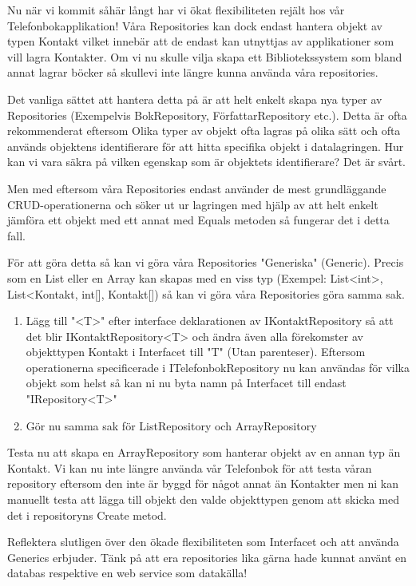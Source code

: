 \documentclass{article}
\begin{document}
     Nu när vi kommit såhär långt har vi ökat flexibiliteten rejält hos vår Telefonbokapplikation! Våra Repositories kan dock endast hantera objekt av typen Kontakt vilket innebär att de endast kan utnyttjas av applikationer som vill lagra Kontakter. Om vi nu skulle vilja skapa ett Bibliotekssystem som bland annat lagrar böcker så skullevi inte längre kunna använda våra repositories.
     
Det vanliga sättet att hantera detta på är att helt enkelt skapa nya typer av Repositories (Exempelvis BokRepository, FörfattarRepository etc.).
Detta är ofta rekommenderat eftersom Olika typer av objekt ofta lagras på olika sätt och ofta används objektens identifierare för att hitta specifika objekt i datalagringen. Hur kan vi vara säkra på vilken egenskap som är objektets identifierare? Det är svårt.

Men med eftersom våra Repositories endast använder de mest grundläggande CRUD-operationerna och söker ut ur lagringen med hjälp av att helt enkelt jämföra ett objekt med ett annat med Equals metoden så fungerar det i detta fall.

För att göra detta så kan vi göra våra Repositories "Generiska" (Generic).
Precis som en List eller en Array kan skapas med en viss typ
(Exempel: List<int>, List<Kontakt, int[], Kontakt[]) så kan vi göra våra Repositories göra samma sak.

    \begin{enumerate}
                 \item Lägg till "<T>" efter interface deklarationen av IKontaktRepository så att det blir IKontaktRepository<T> och ändra även alla förekomster av objekttypen Kontakt i Interfacet till "T" (Utan parenteser). Eftersom operationerna specificerade i ITelefonbokRepository nu kan användas för vilka objekt som helst så kan ni nu byta namn på Interfacet till endast "IRepository<T>"
    	              \item Gör nu samma sak för ListRepository och ArrayRepository
     \end{enumerate}

Testa nu att skapa en ArrayRepository som hanterar objekt av en annan typ än Kontakt. Vi kan nu inte längre använda vår Telefonbok för att testa våran repository eftersom den inte är byggd för något annat än Kontakter men ni kan manuellt testa att lägga till objekt den valde objekttypen genom att skicka med det i repositoryns Create metod.

Reflektera slutligen över den ökade flexibiliteten som Interfacet och att använda Generics erbjuder. Tänk på att era repositories lika gärna hade kunnat använt en databas respektive en web service som datakälla!
\end{document}
